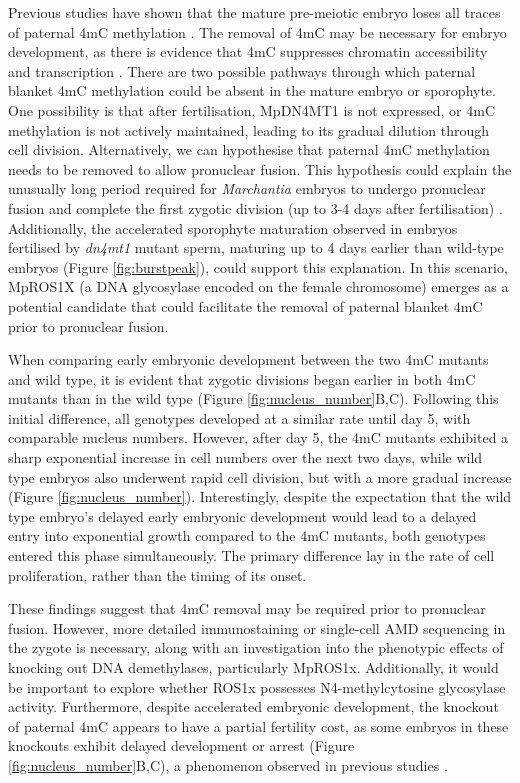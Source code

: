  Previous studies have shown that the mature pre-meiotic embryo loses all traces of paternal 4mC methylation \citep{RN189}. The removal of 4mC may be necessary for embryo development, as there is evidence that 4mC suppresses chromatin accessibility and transcription \citep{RN189}. There are two possible pathways through which paternal blanket 4mC methylation could be absent in the mature embryo or sporophyte.  One possibility is that after fertilisation, MpDN4MT1 is not expressed, or 4mC methylation is not actively maintained, leading to its gradual dilution through cell division. Alternatively, we can hypothesise that paternal 4mC methylation needs to be removed to allow pronuclear fusion. This hypothesis could explain the unusually long period required for \textit{Marchantia} embryos to undergo pronuclear fusion and complete the first zygotic division (up to 3-4 days after fertilisation) \citep{RN139}. Additionally, the accelerated sporophyte maturation observed in embryos fertilised by \textit{dn4mt1} mutant sperm, maturing up to 4 days earlier than wild-type embryos (Figure \ref{fig:burstpeak}), could support this explanation. In this scenario, MpROS1X (a DNA glycosylase encoded on the female chromosome) emerges as a potential candidate that could facilitate the removal of paternal blanket 4mC prior to pronuclear fusion.

When comparing early embryonic development between the two 4mC mutants and wild type, it is evident that zygotic divisions began earlier in both 4mC mutants than in the wild type (Figure \ref{fig:nucleus_number}B,C). Following this initial difference, all genotypes developed at a similar rate until day 5, with comparable nucleus numbers. However, after day 5, the 4mC mutants exhibited a sharp exponential increase in cell numbers over the next two days, while wild type embryos also underwent rapid cell division, but with a more gradual increase (Figure \ref{fig:nucleus_number}). Interestingly, despite the expectation that the wild type embryo's delayed early embryonic development would lead to a delayed entry into exponential growth compared to the 4mC mutants, both genotypes entered this phase simultaneously. The primary difference lay in the rate of cell proliferation, rather than the timing of its onset.

These findings suggest that 4mC removal may be required prior to pronuclear fusion. However, more detailed immunostaining or single-cell AMD sequencing in the zygote is necessary, along with an investigation into the phenotypic effects of knocking out DNA demethylases, particularly MpROS1x. Additionally, it would be important to explore whether ROS1x possesses N4-methylcytosine glycosylase activity. Furthermore, despite accelerated embryonic development, the knockout of paternal 4mC appears to have a partial fertility cost, as some embryos in these knockouts exhibit delayed development or arrest (Figure \ref{fig:nucleus_number}B,C), a phenomenon observed in previous studies \citep{RN189}.

